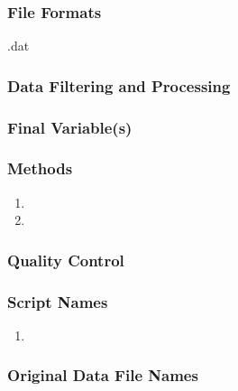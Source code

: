 \subsubsection*{File Formats} 
.dat

\subsubsection*{Data Filtering and Processing}

\subsubsection*{Final Variable(s)}

\subsubsection*{Methods}

\begin{enumerate}
\item 
\item
\end{enumerate}

\subsubsection*{Quality Control}

\subsubsection*{Script Names}

\begin{enumerate}
\item 
\end{enumerate}

\subsubsection*{Original Data File Names}

